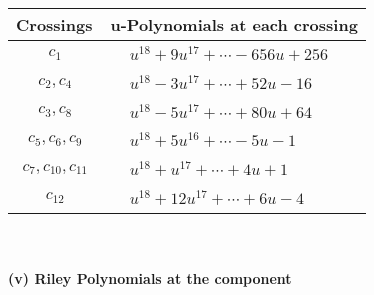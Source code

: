 \documentclass[1p]{elsarticle_modified}
\theoremstyle{definition}
\begin{document}
\begin{tabular}{m{50pt}|m{274pt}}
Crossings & \hspace{64pt}u-Polynomials at each crossing \\
\hline $$\begin{aligned}c_{1}\end{aligned}$$&$\begin{aligned}
&u^{18}+9 u^{17}+\cdots-656 u+256
\end{aligned}$\\
\hline $$\begin{aligned}c_{2},c_{4}\end{aligned}$$&$\begin{aligned}
&u^{18}-3 u^{17}+\cdots+52 u-16
\end{aligned}$\\
\hline $$\begin{aligned}c_{3},c_{8}\end{aligned}$$&$\begin{aligned}
&u^{18}-5 u^{17}+\cdots+80 u+64
\end{aligned}$\\
\hline $$\begin{aligned}c_{5},c_{6},c_{9}\end{aligned}$$&$\begin{aligned}
&u^{18}+5 u^{16}+\cdots-5 u-1
\end{aligned}$\\
\hline $$\begin{aligned}c_{7},c_{10},c_{11}\end{aligned}$$&$\begin{aligned}
&u^{18}+u^{17}+\cdots+4 u+1
\end{aligned}$\\
\hline $$\begin{aligned}c_{12}\end{aligned}$$&$\begin{aligned}
&u^{18}+12 u^{17}+\cdots+6 u-4
\end{aligned}$\\
\hline
\end{tabular}\\~\\
\newpage\renewcommand{\arraystretch}{1}
\flushleft \textbf{(v) Riley Polynomials at the component}\newline \\
\end{document}
